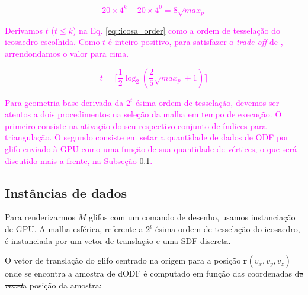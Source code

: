 \textcolor{magenta}{
\begin{equation}
\label{eq::icosa_order_base}
     20\times 4^k - 20\times 4^0 = 8\sqrt{max_p}
\end{equation}
}

\textcolor{magenta}{
Derivamos $t$ ($t \leq k$) na Eq. \ref{eq::icosa_order} como a ordem de tesselação do icosaedro escolhida. Como $t$ é inteiro positivo, para satisfazer o \textit{trade-off} de , arrendondamos o valor para cima.
}

\textcolor{magenta}{
\begin{equation}
\label{eq::icosa_order}
     t = \lceil \frac{1}{2}\log_2{(\frac{2}{5}\sqrt{max_p} + 1)} \rceil
\end{equation}
}

\textcolor{magenta}{
Para geometria base derivada da $2^t$-ésima ordem de tesselação, devemos ser atentos a dois procedimentos na seleção da malha em tempo de execução. O primeiro consiste na ativação do seu respectivo conjunto de índices para triangulação. O segundo consiste em setar a quantidade de dados de ODF por glifo enviado à GPU como uma função de sua quantidade de vértices, o que será discutido mais a frente, na Subseção \ref{ssec::atributos}.
}


\subsection{Instâncias de dados}
\label{ssec::atributos}

Para renderizarmos $M$ glifos com um comando de desenho, usamos instanciação de GPU. A malha esférica, referente a $2^t$-ésima ordem de tesselação do icosaedro, é instanciada por um vetor de translação e uma SDF discreta. 

O vetor de translação do glifo centrado na origem para a posição  $\mathbf{r}(v_x, v_y, v_z)$ onde se encontra a amostra de dODF é computado em função das coordenadas d\sout{e \textit{voxel}}a posição da amostra:

